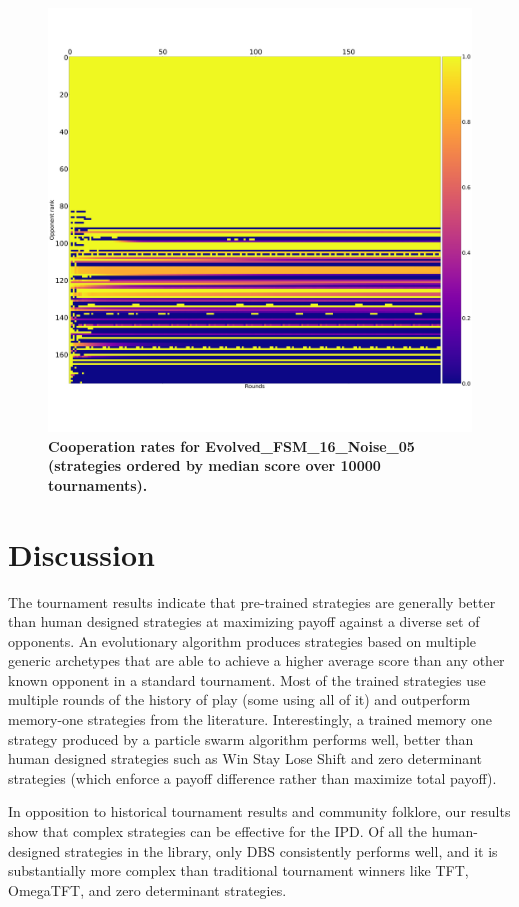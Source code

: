 \documentclass[10pt,letterpaper]{article}
\begin{document}
\begin{figure}[!hbtp]
        \centering
        \includegraphics[width=.7\textwidth]{cooperation_0_0_10000_Evolved_FSM_16_Noise_05_array.pdf}
        \caption{\bf Cooperation rates for Evolved\_FSM\_16\_Noise\_05
            (strategies ordered by median score over 10000 tournaments).}
        \label{fig:comparison_cooperation_heatmaps_noisy_3}
\end{figure}



\section*{Discussion}

The tournament results indicate that pre-trained strategies are generally better
than human designed strategies at maximizing payoff against a diverse set of
opponents. An evolutionary algorithm produces strategies based on multiple
generic archetypes that are able to achieve a higher average
score than any other known opponent in a standard tournament. Most of the trained
strategies use multiple rounds of the history of play (some using all of it) and
outperform memory-one strategies from the literature. Interestingly, a trained
memory one strategy produced by a particle swarm algorithm performs well, better
than human designed strategies such as Win Stay Lose Shift and zero determinant
strategies (which enforce a payoff difference rather than maximize total payoff).

In opposition to historical tournament results and community folklore,
our results show that complex strategies can be effective for the
IPD\@. Of all the human-designed
strategies in the library, only DBS consistently performs well, and it is
substantially more complex than traditional tournament winners like TFT, OmegaTFT,
and zero determinant strategies.
\end{document}
